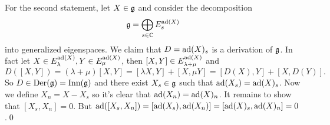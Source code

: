 For the second statement, let $X\in\mathfrak{g}$ and consider the decomposition
\begin{equation}
    \mathfrak{g}=\bigoplus_{s\in\mathbb{C}}E_s^{\text{ad}(X)}
\end{equation}
into generalized eigenspaces. We claim that $D=\text{ad}(X)_s$ is a derivation of $\mathfrak{g}$. In fact 
let $X\in E_\lambda^{\text{ad}(X)}, Y\in E_\mu^{\text{ad}(X)}$, then $[X,Y]\in E_{\lambda+\mu}^{\text{ad}(X)}$ and
\begin{equation}
    D([X,Y])=(\lambda+\mu)[X,Y]=[\lambda X,Y]+[X,\mu Y]=[D(X),Y]+[X,D(Y)].
\end{equation}
So $D\in\text{Der}(\mathfrak{g})=\text{Inn}(\mathfrak{g})$ and there exist $X_s\in\mathfrak{g}$ such that $\text{ad}(X_s)=\text{ad}(X)_s$. 
Now we define $X_n=X-X_s$ so it's clear that $\text{ad}(X_n)=\text{ad}(X)_n$. It remains to show that $[X_s,X_n]=0$. But
$\text{ad}([X_s,X_n])=[\text{ad}(X_s),\text{ad}(X_n)]=[\text{ad}(X)_s,\text{ad}(X)_n]=0$.\qed

